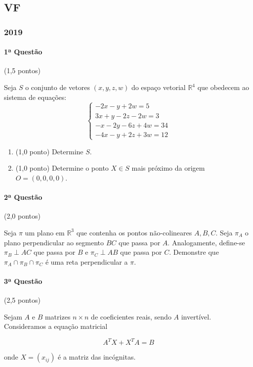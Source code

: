 \documentclass[12pt,a4paper]{article}
\newcommand{\R}{\mathbb{R}}
\begin{document}
\newpage
\subsection{VF}

\subsubsection{2019}

\paragraph{1ª Questão} (1,5 pontos)

Seja $S$ o conjunto de vetores $(x,y,z,w)$ do espaço vetorial $\mathbb{R}^4$ que obedecem ao sistema de equações:
$$\begin{cases}
-2x-y+2w=5 \\
3x+y-2z-2w=3 \\
-x-2y-6z+4w=34\\
-4x-y+2z+3w=12
\end{cases}$$
\begin{enumerate}[label=(\alph*)]
\item (1,0 ponto) Determine $S$.
\item (1,0 ponto) Determine o ponto $X \in S$ mais próximo da origem $O=(0,0,0,0)$.
\end{enumerate}

\paragraph{2ª Questão} (2,0 pontos)

Seja $\pi$ um plano em $\R^3$ que contenha os pontos não-colineares $A, B, C$. Seja $\pi_A$ o plano perpendicular ao segmento $BC$ que passa por $A$. Analogamente, define-se $\pi_B \perp AC$ que passa por $B$ e $\pi_C \perp AB$ que passa por $C$. Demonstre que $\pi_A \cap \pi_B \cap \pi_C$ é uma reta perpendicular a $\pi$.

\paragraph{3ª Questão} (2,5 pontos)

Sejam $A$ e $B$ matrizes $n \times n$ de coeficientes reais, sendo $A$ invertível. Consideramos a equação matricial 

$$ A^TX + X^TA = B $$

onde $X = (x_{ij})$ é a matriz das incógnitas.
\end{document}
